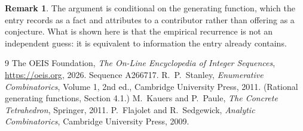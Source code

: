 \documentclass[11pt,a4paper]{article}
\theoremstyle{plain}
\theoremstyle{definition}
\newtheorem{remark}[theorem]{Remark}
\begin{document}
\begin{remark}
The argument is conditional on the generating function, which the entry records as a fact and
attributes to a contributor rather than offering as a conjecture. What is shown here is that
the empirical recurrence is not an independent guess: it is equivalent to information the
entry already contains.
\end{remark}

\begin{thebibliography}{9}
 The OEIS Foundation, \emph{The On-Line Encyclopedia of Integer
Sequences}, \url{https://oeis.org}, 2026. Sequence A266717.
 R.~P.~Stanley, \emph{Enumerative Combinatorics}, Volume 1, 2nd ed.,
Cambridge University Press, 2011. (Rational generating functions, Section 4.1.)
 M.~Kauers and P.~Paule, \emph{The Concrete Tetrahedron}, Springer, 2011.
 P.~Flajolet and R.~Sedgewick, \emph{Analytic Combinatorics}, Cambridge
University Press, 2009.
\end{thebibliography}
\end{document}
